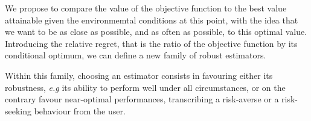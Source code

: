 \documentclass[../../Main_ManuscritThese.tex]{subfiles}
\begin{document}
  
  We propose to compare the value of the objective function to the
best value attainable given the environmemtal conditions at this
point, with the idea that we want to be as close as possible, and as
often as possible, to this optimal value. Introducing the relative
regret, that is the ratio of the objective function by its conditional
optimum, we can define a new family of robust estimators.

  Within this family, choosing an estimator consists in favouring
either its robustness, \emph{e.g} its ability to perform well under
all circumstances, or on the contrary favour near-optimal
performances, transcribing a risk-averse or a risk-seeking behaviour
from the user.
 

\subfileLocal{
	\pagestyle{empty}
	
	
}
\end{document}
